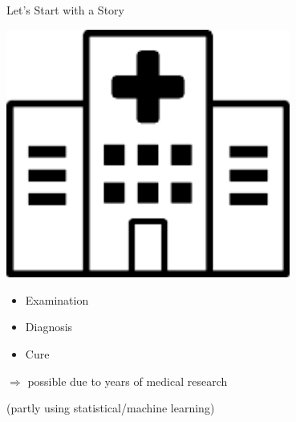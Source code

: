 \documentclass[17pt,aspectratio=169]{beamer}
\begin{document}
\begin{frame}{Let's Start with a Story}
  \begin{minipage}{0.3\linewidth}
    \begin{center}
      \includegraphics[width=0.7\textwidth]{pics/hospital.pdf}
    \end{center}
  \end{minipage}%
  \begin{minipage}{0.7\linewidth}
    \begin{itemize}
      \pause
    \item Examination
      \pause
    \item Diagnosis
      \pause
    \item Cure
    \end{itemize}
  \end{minipage}
  \hspace{1em}

      \pause
      \vspace{0.5em}$\Rightarrow$ possible due to years of medical research

      \hspace{1em} (partly using statistical/machine learning)

\end{frame}
\end{document}
